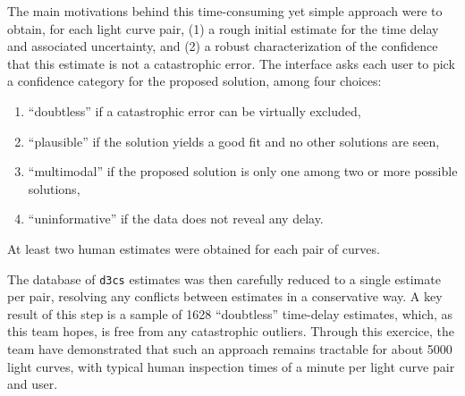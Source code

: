 \documentclass[traditabstract]{aa}
\begin{document}

The main motivations behind this time-consuming yet simple
approach were to obtain, for each light curve pair, (1) a rough
initial estimate for the time delay and associated uncertainty, and
(2) a robust characterization of the confidence that this estimate is
not a catastrophic error. 
The interface asks each user to pick a
confidence category for the proposed solution, among four choices:


\begin{enumerate}
\item ``doubtless'' if a catastrophic error can be virtually excluded,
\item ``plausible'' if the solution yields a good fit and no other solutions are seen,
\item ``multimodal'' if the proposed solution is only one among two or more possible solutions,
\item ``uninformative'' if the data does not reveal any delay.
\end{enumerate}

At least two human estimates were obtained for each pair of curves.


The database of {\tt d3cs}
estimates was then carefully reduced to a single estimate per pair,
resolving any conflicts between estimates in a conservative way. A key
result of this step is a sample of 1628 ``doubtless'' time-delay
estimates, which, as this team hopes, is free from any catastrophic
outliers. Through this exercice, the team have demonstrated that such an
approach remains tractable for about 5000 light curves, with typical
human inspection times of a minute per light curve pair and user.
\end{document}
